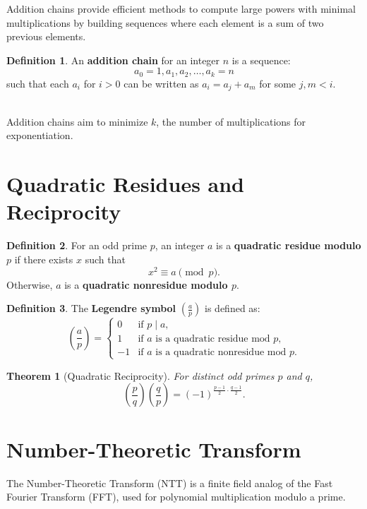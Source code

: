 \documentclass[12pt,openany]{book}
\theoremstyle{definition}
\newtheorem{definition}{Definition}[chapter]
\theoremstyle{plain}
\newtheorem{theorem}{Theorem}[chapter]
\theoremstyle{remark}
\begin{document}
Addition chains provide efficient methods to compute large powers with minimal multiplications by building sequences where each element is a sum of two previous elements.

\begin{definition}
  An \textbf{addition chain} for an integer $n$ is a sequence:
  \[
    a_0=1, a_1, a_2, \ldots, a_k = n
  \]
  such that each $a_i$ for $i > 0$ can be written as $a_i = a_j + a_m$ for some $j, m < i$.
\end{definition}
\noindent
\\
Addition chains aim to minimize $k$, the number of multiplications for exponentiation.

\section{Quadratic Residues and Reciprocity}

\begin{definition}
  For an odd prime $p$, an integer $a$ is a \textbf{quadratic residue modulo $p$} if there exists $x$ such that
  \[
    x^2 \equiv a \pmod{p}.
  \]
  Otherwise, $a$ is a \textbf{quadratic nonresidue modulo $p$}.
\end{definition}

\begin{definition}
  The \textbf{Legendre symbol} $\left(\frac{a}{p}\right)$ is defined as:
  \[
    \left( \frac{a}{p} \right) = \begin{cases}
      0 & \text{if } p \mid a, \\
      1 & \text{if } a \text{ is a quadratic residue mod } p, \\
      -1 & \text{if } a \text{ is a quadratic nonresidue mod } p.
    \end{cases}
  \]
\end{definition}

\begin{theorem}[Quadratic Reciprocity]
  For distinct odd primes $p$ and $q$,
  \[
    \left( \frac{p}{q} \right) \left( \frac{q}{p} \right) = (-1)^{\frac{p-1}{2} \cdot \frac{q-1}{2}}.
  \]
\end{theorem}

\section{Number-Theoretic Transform}

The Number-Theoretic Transform (NTT) is a finite field analog of the Fast Fourier Transform (FFT), used for polynomial multiplication modulo a prime.
\end{document}
